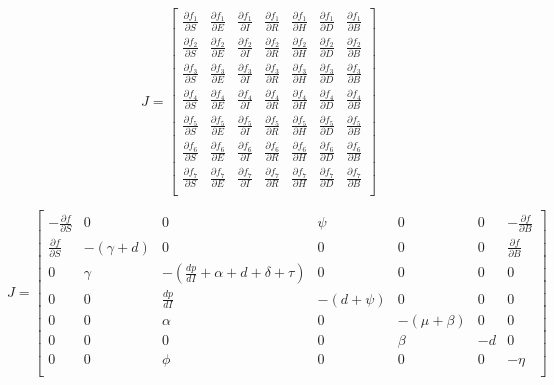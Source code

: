 \documentclass[a4paper,12pt]{report}
\begin{document}
\begin{itemize}
\[
J=
\begin{bmatrix}
\frac{\partial f_1}{\partial S} & \frac{\partial f_1}{\partial E} & \frac{\partial f_1}{\partial I} & \frac{\partial f_1}{\partial R} & \frac{\partial f_1}{\partial H} & \frac{\partial f_1}{\partial D} & \frac{\partial f_1}{\partial B} \\
\frac{\partial f_2}{\partial S} & \frac{\partial f_2}{\partial E} & \frac{\partial f_2}{\partial I} & \frac{\partial f_2}{\partial R} & \frac{\partial f_2}{\partial H} & \frac{\partial f_2}{\partial D} & \frac{\partial f_2}{\partial B} \\
\frac{\partial f_3}{\partial S} & \frac{\partial f_3}{\partial E} & \frac{\partial f_3}{\partial I} & \frac{\partial f_3}{\partial R} & \frac{\partial f_3}{\partial H} & \frac{\partial f_3}{\partial D} & \frac{\partial f_3}{\partial B} \\
\frac{\partial f_4}{\partial S} & \frac{\partial f_4}{\partial E} & \frac{\partial f_4}{\partial I} & \frac{\partial f_4}{\partial R} & \frac{\partial f_4}{\partial H} & \frac{\partial f_4}{\partial D} & \frac{\partial f_4}{\partial B} \\
\frac{\partial f_5}{\partial S} & \frac{\partial f_5}{\partial E} & \frac{\partial f_5}{\partial I} & \frac{\partial f_5}{\partial R} & \frac{\partial f_5}{\partial H} & \frac{\partial f_5}{\partial D} & \frac{\partial f_5}{\partial B} \\
\frac{\partial f_6}{\partial S} & \frac{\partial f_6}{\partial E} & \frac{\partial f_6}{\partial I} & \frac{\partial f_6}{\partial R} & \frac{\partial f_6}{\partial H} & \frac{\partial f_6}{\partial D} & \frac{\partial f_6}{\partial B} \\
\frac{\partial f_7}{\partial S} & \frac{\partial f_7}{\partial E} & \frac{\partial f_7}{\partial I} & \frac{\partial f_7}{\partial R} & \frac{\partial f_7}{\partial H} & \frac{\partial f_7}{\partial D} & \frac{\partial f_7}{\partial B} \\
\end{bmatrix}
\]

\[
J =
\begin{bmatrix}
-\frac{\partial f}{\partial S} & 0 & 0 & \psi & 0 & 0 & -\frac{\partial f}{\partial B} \\
\frac{\partial f}{\partial S} & -(\gamma + d) & 0 & 0 & 0 & 0 & \frac{\partial f}{\partial B} \\
0 & \gamma & -\left( \frac{dp}{dI} + \alpha + d + \delta + \tau \right) & 0 & 0 & 0 & 0 \\
0 & 0 & \frac{dp}{dI} & -(d + \psi) & 0 & 0 & 0 \\
0 & 0 & \alpha & 0 & -(\mu + \beta) & 0 & 0 \\
0 & 0 & 0 & 0 & \beta & -d & 0 \\
0 & 0 & \phi & 0 & 0 & 0 & -\eta \\
\end{bmatrix}
\]



\end{itemize}
\end{document}
